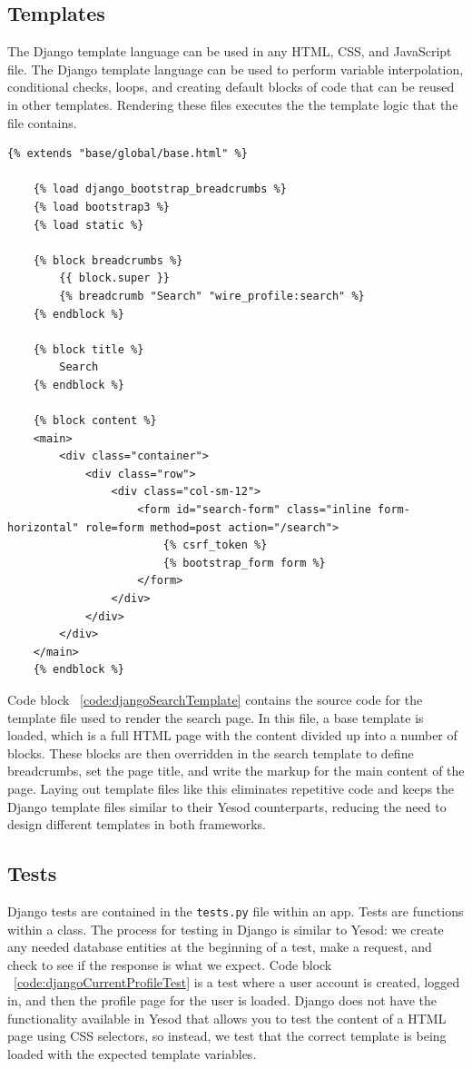 \subsection{Templates}
The Django template language can be used in any HTML, CSS, and JavaScript
file. The Django template language can be used to perform variable interpolation,
conditional checks, loops, and creating default blocks of code that can be reused
in other templates. Rendering these files executes the the template logic that the
file contains. \parencite{djangoTemplates}

\begin{lstlisting}[caption={Template file for the search page},label={code:djangoSearchTemplate}]
	{% extends "base/global/base.html" %}

	{% load django_bootstrap_breadcrumbs %}
	{% load bootstrap3 %}
	{% load static %}
	
	{% block breadcrumbs %}
		{{ block.super }}
		{% breadcrumb "Search" "wire_profile:search" %}
	{% endblock %}
	
	{% block title %}
		Search
	{% endblock %}
	
	{% block content %}
	<main>
		<div class="container">
			<div class="row">
				<div class="col-sm-12">
					<form id="search-form" class="inline form-horizontal" role=form method=post action="/search">
						{% csrf_token %}
						{% bootstrap_form form %}
					</form>
				</div>
			</div>
		</div>
	</main>
	{% endblock %}
\end{lstlisting}

Code block ~\ref{code:djangoSearchTemplate} contains the source code for the
template file used to render the search page. In this file, a base template
is loaded, which is a full HTML page with the content divided up
into a number of blocks. These blocks are then overridden in the search template
to define breadcrumbs, set the page title, and write the markup for the main
content of the page. Laying out template files like this eliminates repetitive
code and keeps the Django template files similar to their Yesod counterparts,
reducing the need to design different templates in both frameworks.

\subsection{Tests}

Django tests are contained in the \texttt{tests.py} file within an app. Tests
are functions within a class. The process for testing in Django is similar to
Yesod: we create any needed database entities at the beginning of a test,
make a request, and check to see if the response is what we expect. Code
block ~\ref{code:djangoCurrentProfileTest} is a test where a user account
is created, logged in, and then the profile page for the user is loaded.
Django does not have the functionality available in Yesod that allows you
to test the content of a HTML page using CSS selectors, so instead, we test
that the correct template is being loaded with the expected template variables.

